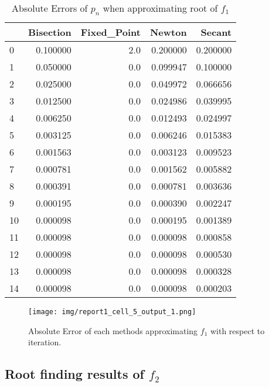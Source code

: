 \documentclass[a4paper,12pt]{article}
\begin{document}
\begin{table}
\begin{center}
	\begin{tabular}{lrrrr}
	\toprule
	{} &  Bisection &  Fixed\_Point &    Newton &    Secant \\
	\midrule
	0  &   0.100000 &          2.0 &  0.200000 &  0.200000 \\
	1  &   0.050000 &          0.0 &  0.099947 &  0.100000 \\
	2  &   0.025000 &          0.0 &  0.049972 &  0.066656 \\
	3  &   0.012500 &          0.0 &  0.024986 &  0.039995 \\
	4  &   0.006250 &          0.0 &  0.012493 &  0.024997 \\
	5  &   0.003125 &          0.0 &  0.006246 &  0.015383 \\
	6  &   0.001563 &          0.0 &  0.003123 &  0.009523 \\
	7  &   0.000781 &          0.0 &  0.001562 &  0.005882 \\
	8  &   0.000391 &          0.0 &  0.000781 &  0.003636 \\
	9  &   0.000195 &          0.0 &  0.000390 &  0.002247 \\
	10 &   0.000098 &          0.0 &  0.000195 &  0.001389 \\
	11 &   0.000098 &          0.0 &  0.000098 &  0.000858 \\
	12 &   0.000098 &          0.0 &  0.000098 &  0.000530 \\
	13 &   0.000098 &          0.0 &  0.000098 &  0.000328 \\
	14 &   0.000098 &          0.0 &  0.000098 &  0.000203 \\
	\bottomrule
	\end{tabular}
	\caption{Absolute Errors of $p_n$ when approximating root of $f_1$}
\end{center}
\end{table}

\begin{figure}[H]
    \centering
     \texttt{[image: img/report1\_cell\_5\_output\_1.png]}
     \caption{Absolute Error of each methods approximating $f_1$ with respect to iteration.}
     \label{fig:2}   
\end{figure}

\subsection{Root finding results of $f_2$}
\end{document}
